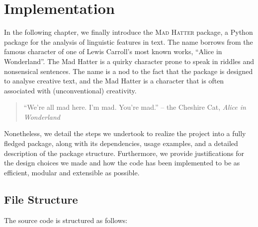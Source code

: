 \chapter{Implementation}
\label{chap:implementation}
In the following chapter, we finally introduce the \textsc{Mad Hatter} package, a Python package for the analysis of linguistic features in text. The name borrows from the famous character of one of Lewis Carroll's most known works, ``Alice in Wonderland''. The Mad Hatter is a quirky character prone to speak in riddles and nonsensical sentences. The name is a nod to the fact that the package is designed to analyse creative text, and the Mad Hatter is a character that is often associated with (unconventional) creativity. 

\begin{quote}
    ``We're all mad here. I'm mad. You're mad.'' -- the Cheshire Cat, \textit{Alice in Wonderland}
\end{quote}

Nonetheless, we detail the steps we undertook to realize the project into a fully fledged package, along with its dependencies, usage examples, and a detailed description of the package structure. Furthermore, we provide justifications for the design choices we made and how the code has been implemented to be as efficient, modular and extensible as possible. 

\section{File Structure}

The source code is structured as follows:

